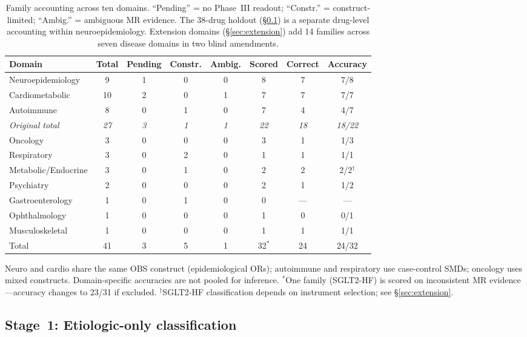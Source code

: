\documentclass[11pt]{article}
\begin{document}
\begin{table}[t]
\centering
\caption{Family accounting across ten domains. ``Pending'' = no Phase~III readout; ``Constr.'' = construct-limited; ``Ambig.'' = ambiguous MR evidence. The 38-drug holdout (\S\ref{sec:stage1}) is a separate drug-level accounting within neuroepidemiology. Extension domains (\S\ref{sec:extension}) add 14 families across seven disease domains in two blind amendments.}
\label{tab:accounting}
\small
\begin{tabular}{lccccccc}
\toprule
Domain & Total & Pending & Constr. & Ambig. & Scored & Correct & Accuracy \\
\midrule
Neuroepidemiology & 9 & 1 & 0 & 0 & 8 & 7 & 7/8 \\
Cardiometabolic & 10 & 2 & 0 & 1 & 7 & 7 & 7/7 \\
Autoimmune & 8 & 0 & 1 & 0 & 7 & 4 & 4/7 \\
\midrule
\emph{Original total} & \emph{27} & \emph{3} & \emph{1} & \emph{1} & \emph{22} & \emph{18} & \emph{18/22} \\
\midrule
Oncology & 3 & 0 & 0 & 0 & 3 & 1 & 1/3 \\
Respiratory & 3 & 0 & 2 & 0 & 1 & 1 & 1/1 \\
Metabolic/Endocrine & 3 & 0 & 1 & 0 & 2 & 2 & 2/2$^\dagger$ \\
Psychiatry & 2 & 0 & 0 & 0 & 2 & 1 & 1/2 \\
Gastroenterology & 1 & 0 & 1 & 0 & 0 & --- & --- \\
Ophthalmology & 1 & 0 & 0 & 0 & 1 & 0 & 0/1 \\
Musculoskeletal & 1 & 0 & 0 & 0 & 1 & 1 & 1/1 \\
\midrule
Total & 41 & 3 & 5 & 1 & 32$^*$ & 24 & 24/32 \\
\bottomrule
\end{tabular}

\vspace{1mm}
{\footnotesize
Neuro and cardio share the same OBS construct (epidemiological ORs); autoimmune and respiratory use case-control SMDs; oncology uses mixed constructs. Domain-specific accuracies are not pooled for inference. $^*$One family (SGLT2-HF) is scored on inconsistent MR evidence---accuracy changes to 23/31 if excluded. $^\dagger$SGLT2-HF classification depends on instrument selection; see \S\ref{sec:extension}.}
\end{table}

\subsection{Stage~1: Etiologic-only classification}
\label{sec:stage1}
\end{document}
